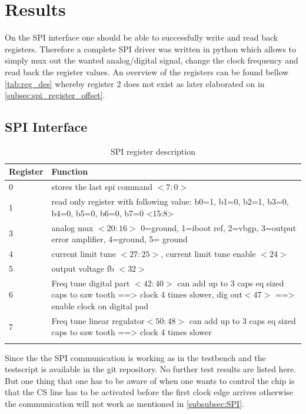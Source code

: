 \section{Results}
\label{sec:results}
On the SPI interface one should be able to successfully write and read back registers. Therefore a complete SPI driver was written in python which allows to simply mux out the wanted analog/digital signal, change the clock frequency and read back the register values. An overview of the registers can be found bellow \autoref{tab:reg_des} whereby register 2 does not exist as later elaborated on in \autoref{subsec:spi_register_offset}.
\subsection{SPI Interface}
\label{subsec:spi_interface}
\begin{longtable}{|p{1.5cm}|p{10.5cm}|}
	\hline
	\rowcolor{lightgray}
	\textbf{Register} &\textbf{Function} \\ \hline
	0 & stores the last spi command $<7:0>$\\ \hline
    1 & read only register with following value: b0=1, b1=0, b2=1, b3=0, b4=0, b5=0, b6=0, b7=0 <15:8> \\ \hline
    3 & analog mux $<20:16>$ 0=ground, 1=iboot ref, 2=vbgp, 3=output error amplifier, 4=ground,  5= ground \\ \hline
	4 & current limit tune $<27:25>$, current limit tune enable $<24>$ \\ \hline
	5 & output voltage fb $<32>$ \\ \hline
	6 & Freq tune digital part $<42:40>$ can add up to 3 caps eq sized caps to saw tooth ==> clock 4 times slower, dig out$<47>$ ==> enable clock on digital pad\\ \hline
    7 & Freq tune linear regulator$<50:48>$ can add up to 3 caps eq sized caps to saw tooth ==> clock 4 times slower \\ \hline
	\caption{SPI register description} %
	\label{tab:reg_des}
\end{longtable}
Since the the SPI communication is working as in the testbench and the testscript is available in the git repository. No further test results are listed here. But one thing that one has to be aware of when one wants to control the chip is that the CS line has to be activated before the first clock edge arrives otherwise the communication will not work as mentioned in \autoref{subsubsec:SPI}.

